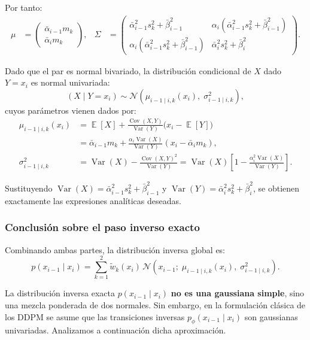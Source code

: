 \documentclass[11pt,a4paper]{article}
\DeclareMathOperator{\E}{\mathbb{E}}
\DeclareMathOperator{\Var}{Var}
\DeclareMathOperator{\Cov}{Cov}
\begin{document}
Por tanto:
\begin{align*}
  \mu &= \begin{pmatrix} \bar{\alpha}_{i-1} m_k \\ \bar{\alpha}_i m_k \end{pmatrix}, &\Sigma &= \begin{pmatrix} \bar{\alpha}_{i-1}^2 s_k^2 + \bar{\beta}_{i-1}^2 & \alpha_i (\bar{\alpha}_{i-1}^2 s_k^2 + \bar{\beta}_{i-1}^2) \\ \alpha_i (\bar{\alpha}_{i-1}^2 s_k^2 + \bar{\beta}_{i-1}^2) & \bar{\alpha}_i^2 s_k^2 + \bar{\beta}_i^2 \end{pmatrix}.
\end{align*}

Dado que el par es normal bivariado, la distribución condicional de $X$ dado $Y = x_i$ es normal univariada:
\[
(X \mid Y = x_i) \sim \mathcal{N}\left(\mu_{i-1\mid i, k}(x_i), \; \sigma_{i-1\mid i, k}^2\right),
\]
cuyos parámetros vienen dados por:
\begin{align*}
    \mu_{i-1\mid i, k}(x_i) &= \E[X] + \frac{\Cov(X, Y)}{\Var(Y)}\big(x_i - \E[Y]\big) \\
    &= \bar{\alpha}_{i-1} m_k + \frac{\alpha_i \Var(X)}{\Var(Y)}\left(x_i - \bar{\alpha}_i m_k\right), \\[0.6em]
    \sigma_{i-1\mid i, k}^2 &= \Var(X) - \frac{\Cov(X, Y)^2}{\Var(Y)} = \Var(X)\left[1 - \frac{\alpha_i^2 \Var(X)}{\Var(Y)}\right].
\end{align*}

Sustituyendo $\Var(X) = \bar{\alpha}_{i-1}^2 s_k^2 + \bar{\beta}_{i-1}^2$ y $\Var(Y) = \bar{\alpha}_i^2 s_k^2 + \bar{\beta}_i^2$, se obtienen exactamente las expresiones analíticas deseadas.

\subsubsection{Conclusión sobre el paso inverso exacto}

Combinando ambas partes, la distribución inversa global es:
\[
p(x_{i-1} \mid x_i) = \sum_{k=1}^2 \tilde{w}_k(x_i) \, \mathcal{N}\left(x_{i-1};\; \mu_{i-1\mid i, k}(x_i),\; \sigma_{i-1\mid i, k}^2\right).
\]

La distribución inversa exacta $p(x_{i-1} \mid x_i)$ \textbf{no es una gaussiana simple}, sino una mezcla ponderada de dos normales. Sin embargo, en la formulación clásica de los DDPM se asume que las transiciones inversas $p_\phi(x_{i-1} \mid x_i)$ son gaussianas univariadas. Analizamos a continuación dicha aproximación.
\end{document}
